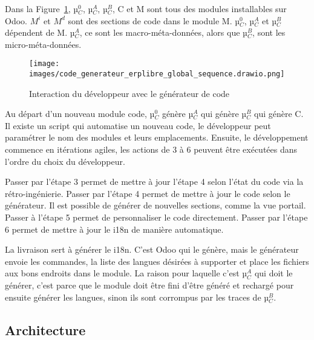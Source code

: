 Dans la Figure~\ref{fig:dia_sequence_gc}, µ$_C^0$, µ$_C^A$, µ$_C^B$, C et M sont tous des modules installables sur Odoo. $M^i$ et $M^d$ sont des sections de code dans le module M. µ$_C^0$, µ$_C^A$ et µ$_C^B$ dépendent de M. µ$_C^A$, ce sont les macro-méta-données, alors que µ$_C^B$, sont les micro-méta-données.

\begin{figure}
\centering
\texttt{[image: images/code\_generateur\_erplibre\_global\_sequence.drawio.png]}
\caption{Interaction du développeur avec le générateur de code}
\label{fig:dia_sequence_gc}
\end{figure}

Au départ d’un nouveau module code, µ$_C^0$ génère µ$_C^A$ qui génère µ$_C^B$ qui génère C. Il existe un script qui automatise un nouveau code, le développeur peut paramétrer le nom des modules et leurs emplacements. Ensuite, le développement commence en itérations agiles, les actions de 3 à 6 peuvent être exécutées dans l’ordre du choix du développeur.


Passer par l’étape 3 permet de mettre à jour l’étape 4 selon l’état du code via la rétro-ingénierie. Passer par l’étape 4 permet de mettre à jour le code selon le générateur. Il est possible de générer de nouvelles sections, comme la vue portail. Passer à l’étape 5 permet de personnaliser le code directement. Passer par l’étape 6 permet de mettre à jour le i18n de manière automatique.

La livraison sert à générer le i18n. C’est Odoo qui le génère, mais le générateur envoie les commandes, la liste des langues désirées à supporter et place les fichiers aux bons endroits dans le module. La raison pour laquelle c’est µ$_C^A$ qui doit le générer, c’est parce que le module doit être fini d’être généré et rechargé pour ensuite générer les langues, sinon ils sont corrompus par les traces de µ$_C^B$.


\subsection{Architecture}\label{architecture_result}

